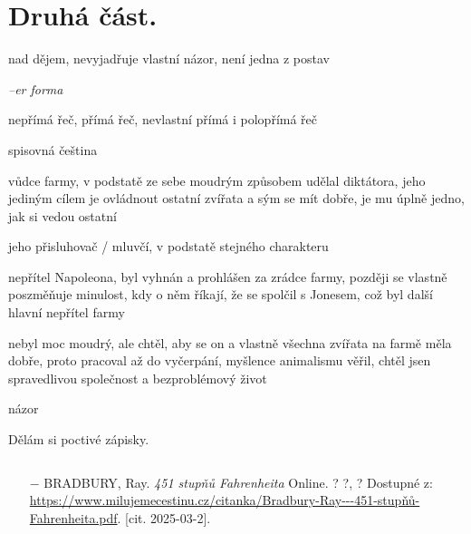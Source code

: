 \documentclass{article}
\begin{document}
\section{Druhá část.}
\begin{description}
    \setlength\itemsep{0.15em}
    \item[vypravěč:] nad dějem, nevyjadřuje vlastní názor, není jedna z postav
    \item[vyprávěcí způsoby:] \textit{--er forma}
    \item[typy promluv:] nepřímá řeč, přímá řeč, nevlastní přímá i polopřímá řeč
    \item[jazyková stránka:] spisovná čeština
    \item[postavy:]
        \begin{description}
            \setlength\itemsep{0.15em}
 			\item[Napoleon,] vůdce farmy, v podstatě ze sebe moudrým způsobem udělal diktátora, jeho jediným cílem je ovládnout ostatní zvířata a sým se mít dobře, je mu úplně jedno, jak si vedou ostatní
   	        \item[Pištík,] jeho přisluhovač / mluvčí, v podstatě stejného charakteru
           	\item[Kuliš,] nepřítel Napoleona, byl vyhnán a prohlášen za zrádce farmy, později se vlastně poszměňuje minulost, kdy o něm
                říkají, že se spolčil s Jonesem, což byl další hlavní nepřítel farmy
           	\item[Boxer,] nebyl moc moudrý, ale chtěl, aby se on a vlastně všechna zvířata na farmě měla dobře, proto pracoval až do vyčerpání, myšlence animalismu věřil, chtěl jsen spravedlivou společnost a bezproblémový život
        \end{description}
    \item[názor:] názor
    \item[kontext:]  Dělám si poctivé zápisky.
    \item[zdroje:] $ $
    \begin{itemize}
        \setlength\itemsep{0em}
        \item[$-$] BRADBURY, Ray. \textit{451 stupňů Fahrenheita} Online. ? ?, ? Dostupné z: \url{https://www.milujemecestinu.cz/citanka/Bradbury-Ray---451-stupňů-Fahrenheita.pdf}. [cit. 2025-03-2].
    \end{itemize}
\end{description}
\end{document}
